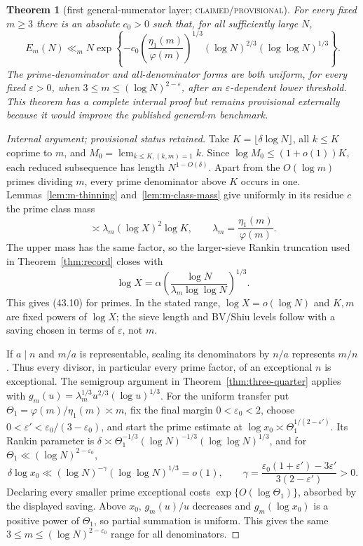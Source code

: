 \documentclass[10pt,reqno]{amsart}
\newtheorem{theorem}{Theorem}[section]
\theoremstyle{definition}
\newcommand{\lcm}{\operatorname {lcm}}
\newcommand{\1}{\mathbf 1}
\newcommand{\eps}{\varepsilon}
\begin{document}
\begin{theorem}[first general-numerator layer; \textsc{claimed/provisional}]
\label{thm:general-two-third}
For every fixed $m\geq3$ there is an absolute $c_0>0$ such that, for all
sufficiently large $N$,
\begin{equation}\tag{43.10}
 E_m(N)\ll_m N\exp\left\{-c_0
 \left(\frac{\eta_1(m)}{\varphi(m)}\right)^{1/3}
 (\log N)^{2/3}(\log\log N)^{1/3}\right\}.
\end{equation}
The prime-denominator and all-denominator forms are both uniform, for every
fixed $\eps>0$, when $3\leq m\leq(\log N)^{2-\eps}$, after an
$\eps$-dependent lower threshold.  This theorem has a complete internal
proof but remains provisional externally because it would improve the
published general-$m$ benchmark.
\end{theorem}
\begin{proof}[Internal argument; provisional status retained]
Take $K=\lfloor\delta\log N\rfloor$, all $k\leq K$ coprime to $m$, and
$M_0=\lcm_{k\leq K,(k,m)=1}k$.  Since
$\log M_0\leq(1+o(1))K$, each reduced subsequence has length
$N^{1-O(\delta)}$.  Apart from the $O(\log m)$ primes dividing $m$, every
prime denominator above $K$ occurs in one.  Lemmas~\ref{lem:m-thinning}
and~\ref{lem:m-class-mass} give uniformly in its residue $c$ the prime
class mass
\[
 \asymp\lambda_m(\log X)^2\log K,
 \qquad \lambda_m=\frac{\eta_1(m)}{\varphi(m)}.
\]
The upper mass has the same factor, so the larger-sieve Rankin truncation
used in Theorem~\ref{thm:record} closes with
\[
 \log X=\alpha\left(\frac{\log N}{\lambda_m\log\log N}\right)^{1/3}.
\]
This gives (43.10) for primes.  In the stated range,
$\log X=o(\log N)$ and $K,m$ are fixed powers of $\log X$; the sieve
length and BV/Shiu levels follow with a saving chosen in terms of $\eps$,
not $m$.

If $a\mid n$ and $m/a$ is representable, scaling its denominators by $n/a$
represents $m/n$.  Thus every divisor, in particular every prime factor, of
an exceptional $n$ is exceptional.  The semigroup argument in Theorem~\ref{thm:three-quarter} applies with
$g_m(u)=\lambda_m^{1/3}u^{2/3}(\log u)^{1/3}$.  For the uniform transfer put
$\Theta_1=\varphi(m)/\eta_1(m)\asymp m$, fix the final margin
$0<\eps_0<2$, choose $0<\eps'<\eps_0/(3-\eps_0)$, and start the prime
estimate at $\log x_0\asymp\Theta_1^{1/(2-\eps')}$.  Its Rankin parameter
is $\delta\asymp\Theta_1^{-1/3}(\log N)^{-1/3}
(\log\log N)^{1/3}$, and for $\Theta_1\ll(\log N)^{2-\eps_0}$,
\[
 \delta\log x_0\ll(\log N)^{-\gamma}(\log\log N)^{1/3}=o(1),
 \qquad
 \gamma=\frac{\eps_0(1+\eps')-3\eps'}{3(2-\eps')}>0.
\]
Declaring every smaller prime exceptional costs
$\exp\{O(\log\Theta_1)\}$, absorbed by the displayed saving.  Above $x_0$,
$g_m(u)/u$ decreases and $g_m(\log x_0)$ is a positive power of
$\Theta_1$, so partial summation is uniform.  This gives the same
$3\leq m\leq(\log N)^{2-\eps_0}$ range for all denominators.
\end{proof}
\end{document}
